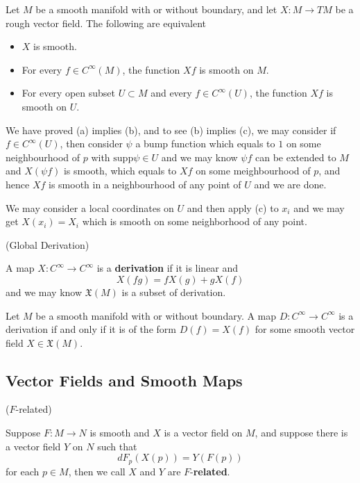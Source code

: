 \begin{proposition}
    Let $M$ be a smooth manifold with or without boundary, and let $X:M\to TM$ be a rough vector field. The following are equivalent
    \begin{itemize}
        \item $X$ is smooth.
        \item For every $f\in C^{\infty}(M)$, the function $Xf$ is smooth on $M$.
        \item For every open subset $U\subset M$ and every $f\in C^{\infty}(U)$, the function $Xf$ is smooth on $U$.
    \end{itemize}
\end{proposition}
\Pf\par
    We have proved (a) implies (b), and to see (b) implies (c), we may consider if $f\in C^{\infty}(U)$, then consider $\psi$ a bump function which equals to $1$ on some neighbourhood of $p$ with $\text{supp} \psi \in U$ and we may know $\psi f$ can be extended to $M$ and $X(\psi f)$ is smooth, which equals to $Xf$ on some meighbourhood of $p$, and hence $Xf$ is smooth in a neighbourhood of any point of $U$ and we are done.\par
    We may consider a local coordinates on $U$ and then apply (c) to $x_i$ and we may get $X(x_i) = X_i$ which is smooth on some neighborhood of any point.

\begin{definition}(Global Derivation)\par
    A map $X:C^{\infty}\to C^{\infty}$ is a \textbf{derivation} if it is linear and
    \[
    X(fg) = fX(g) + gX(f)
    \]
    and we may know $\mathfrak{X}(M)$ is a subset of derivation.
\end{definition} 

\begin{proposition}
    Let $M$ be a smooth manifold with or without boundary. A map $D:C^{\infty} \to C^{\infty}$ is a derivation if and only if it is of the form $D(f) = X(f)$ for some smooth vector field $X\in\mathfrak{X}(M)$.
\end{proposition}

\subsection{Vector Fields and Smooth Maps}

\begin{definition}($F$-related)\par
    Suppose $F:M\to N$ is smooth and $X$ is a vector field on $M$, and suppose there is a vector field $Y$ on $N$ such that
    \[dF_p(X(p)) = Y(F(p))\]
    for each $p\in M$, then we call $X$ and $Y$ are $F$-\textbf{related}.
\end{definition}

